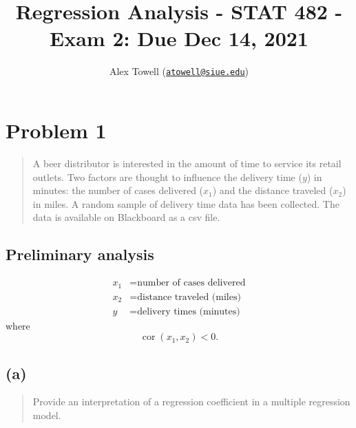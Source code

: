 \documentclass[
]{article}
\title{Regression Analysis - STAT 482 - Exam 2: Due Dec 14, 2021}
\author{Alex Towell
(\href{mailto:atowell@siue.edu}{\nolinkurl{atowell@siue.edu}})}
\date{}
\begin{document}
\maketitle

\newcommand{\sos}[1]{\mathrm{SS_{#1}}}
\newcommand{\ms}[1]{\mathrm{MS_{#1}}}
\newcommand{\sd}{\operatorname{sd}}
\newcommand{\var}{\operatorname{var}}
\newcommand{\expect}{\operatorname{E}}
\newcommand{\corr}{\operatorname{cor}}
\newcommand{\cov}{\operatorname{cov}}
\newcommand{\se}{\operatorname{se}}
\newcommand{\eval}[2]{\left. #1 \right\vert_{#2}}
\newcommand{\degf}[1]{\mathrm{df_{#1}}}
\newcommand{\entropy}{\operatorname{H}}
\newcommand{\param}[1]{\textcolor{blue}{\texttt{#1}}}
\newcommand{\ci}{\operatorname{CI}}

\hypertarget{problem-1}{%
\section{Problem 1}\label{problem-1}}

\begin{quote}
A beer distributor is interested in the amount of time to service its
retail outlets. Two factors are thought to influence the delivery time
(\(y\)) in minutes: the number of cases delivered (\(x_1\)) and the
distance traveled (\(x_2\)) in miles. A random sample of delivery time
data has been collected. The data is available on Blackboard as a csv
file.
\end{quote}

\hypertarget{preliminary-analysis}{%
\subsection{Preliminary analysis}\label{preliminary-analysis}}

\begin{align*}
  x_1 &= \text{number of cases delivered}\\
  x_2 &= \text{distance traveled (miles)}\\
  y   &= \text{delivery times (minutes)}
\end{align*} where \[
  \corr(x_1,x_2) < 0.
\]

\hypertarget{a}{%
\subsection{(a)}\label{a}}

\begin{quote}
Provide an interpretation of a regression coefficient in a multiple
regression model.
\end{quote}
\end{document}
